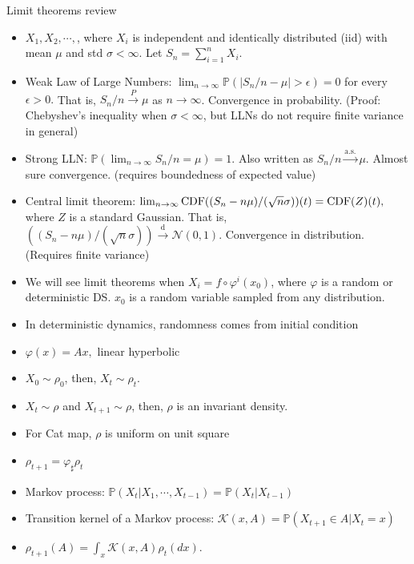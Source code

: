 \documentclass[final]{beamer}
\newcommand{\convergesInProb}{\stackrel{P}{\to}}
\newcommand{\convergesAlmostSurely}{\stackrel{\mathrm{a.s.}}{\to}}
\newcommand{\convergesInDist}{\stackrel{\mathrm{d}}{\to}}
\begin{document}
\begin{frame}{Limit theorems review}
	\begin{itemize}
		\item $X_1, X_2, \cdots, $, where $X_i$ is independent and identically distributed (iid) with mean $\mu$ and std $\sigma < \infty$. Let $S_n = \sum_{i=1}^n X_i.$ 
		\item Weak Law of Large Numbers: $\lim_{n\to \infty} \mathbb{P}(|S_n/n - \mu| > \epsilon) = 0$ for every $\epsilon > 0.$  That is, $S_n/n \convergesInProb \mu$ as $n \to \infty$. Convergence in probability. 
			(Proof: Chebyshev's inequality when $\sigma < \infty$, but LLNs do not require finite variance in general)
		\item Strong LLN: $\mathbb{P}(\lim_{n\to \infty} S_n/n = \mu) = 1.$ Also written as $S_n/n \convergesAlmostSurely \mu.$ Almost sure convergence. (requires boundedness of expected value)  
		\item Central limit theorem: $\lim_{n\to\infty} {\rm CDF}((S_n-n\mu)/(\sqrt{n}\sigma))(t) = {\rm CDF}(Z)(t),$ where $Z$ is a standard Gaussian. That is, $((S_n-n\mu)/(\sqrt{n}\sigma)) \convergesInDist \mathcal{N}(0, 1).$ Convergence in distribution. (Requires finite variance)  
		\end{itemize}
\end{frame}



\begin{frame}
	\begin{itemize}
\item We will see limit theorems when $X_i = f\circ \varphi^i(x_0)$, where $\varphi$ is a random or deterministic DS. $x_0$ is a random variable sampled from any distribution.
	
		\item In deterministic dynamics, randomness comes from initial condition 
		\item $\varphi(x) = Ax ,$ linear hyperbolic
		\item $X_0 \sim \rho_0$, then, $X_t \sim \rho_t.$ 
		\item $X_{t} \sim \rho$ and $X_{t+1} \sim \rho$, then, $\rho$ is an invariant density.
		\item For Cat map, $\rho$ is uniform on unit square
		\item $\rho_{t+1} = \varphi_\sharp \rho_t$
		\item Markov process: 
			$\mathbb{P}(X_t|X_1, \cdots, X_{t-1}) = \mathbb{P}(X_t|X_{t-1})$
		\item Transition kernel of a Markov process: $\mathcal{K}(x, A) = \mathbb{P}(X_{t+1} \in A|X_t = x)$
		\item $\rho_{t+1}(A) = \int_x \mathcal{K}(x, A) \rho_t(dx).$
	\end{itemize}
\end{frame}
\end{document}
